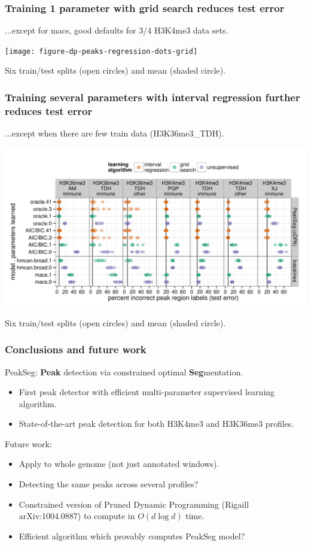 \documentclass{beamer}
\begin{document}
\begin{frame}
  \frametitle{Training 1 parameter with grid search reduces test error}

  ...except for macs, good defaults for 3/4 H3K4me3 data sets.

  \texttt{[image: figure-dp-peaks-regression-dots-grid]}

  Six train/test splits (open circles) and mean (shaded circle).
\end{frame}

\begin{frame}
  \frametitle{Training several parameters with interval regression 
    further reduces test error}

  ...except when there are few train data (H3K36me3\_TDH).

  \includegraphics[width=\textwidth]{figure-dp-peaks-regression-dots}

  Six train/test splits (open circles) and mean (shaded circle).
\end{frame}

\begin{frame}
  \frametitle{Conclusions and future work}
  PeakSeg: \textbf{Peak} detection via constrained optimal
  \textbf{Seg}mentation.
  \begin{itemize}
  \item First peak detector with efficient multi-parameter supervised
    learning algorithm.
  \item State-of-the-art peak detection for both H3K4me3 and H3K36me3
    profiles.
  \end{itemize}
  Future work:
  \begin{itemize}
  \item Apply to whole genome (not just annotated windows).
  \item Detecting the same peaks across several profiles?
  \item Constrained version of Pruned Dynamic Programming (Rigaill
    arXiv:1004.0887) to compute in $O(d\log d)$ time.
  \item Efficient algorithm which provably computes PeakSeg model?
  \end{itemize}
\end{frame}
\end{document}
